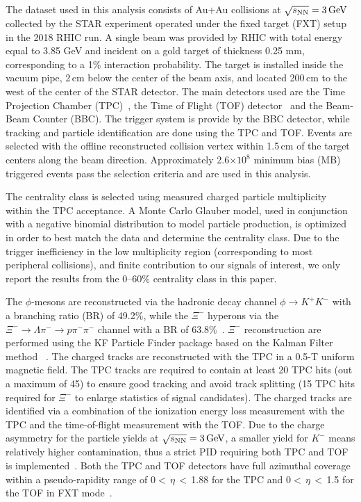 \documentclass[%
 reprint,	
showpacs,
 amsmath,amssymb,
 aps,
 prc,
]{revtex4-1}
\begin{document}
The dataset used in this analysis consists of Au+Au collisions at ${\sqrt{s_{\rm NN}} = \rm{3\,GeV}}$ collected by the STAR experiment operated under the fixed target (FXT) setup in the 2018 RHIC run. %
A single beam was provided by RHIC with total energy equal to 3.85 GeV and incident on a gold target of thickness 0.25 mm, corresponding to a 1\% interaction probability.
The target is installed inside the vacuum pipe, 2\,cm below the center of the beam axis, and located 200\,cm to the west of the center of the STAR detector. The main detectors used are the Time Projection Chamber (TPC)~\cite{TPC}, the Time of Flight (TOF) detector~\cite{TOF} and the Beam-Beam Counter (BBC). The trigger system is provide by the BBC detector, while tracking and particle identification are done using the TPC and TOF. Events are selected with the offline reconstructed collision vertex within 1.5\,cm of the target centers along the beam direction. Approximately 2.6$\times 10^{8}$ minimum bias (MB) triggered events pass the selection criteria and are used in this analysis. 

The centrality class is selected using measured charged particle multiplicity within the TPC acceptance. 
A Monte Carlo Glauber model, used in conjunction with a negative binomial distribution to model particle production, is optimized in order to best match the data and determine the centrality class. Due to the trigger inefficiency in the low multiplicity region (corresponding to most peripheral collisions), and finite contribution to our signals of interest, we only report the results from the 0--60\% centrality class in this paper.

The $\phi$-mesons are reconstructed via the hadronic decay channel $\phi\rightarrow K^+K^-$ with a branching ratio (BR) of 49.2\%, while the $\Xi^{-}$ hyperons via the $\Xi^-\rightarrow \Lambda\pi^-\rightarrow p\pi^-\pi^-$ channel with a BR of 63.8\%~\cite{pdg}. $\Xi^-$ reconstruction are performed using the KF Particle Finder package based on the Kalman Filter method
~\cite{Kisel:2018nvd}. The charged tracks are reconstructed with the TPC in a 0.5-T uniform magnetic field. The TPC tracks are required to contain at least 20 TPC hits (out a maximum of 45) to ensure good tracking and avoid track splitting (15 TPC hits required for $\Xi^{-}$ to enlarge statistics of signal candidates). The charged tracks are identified via a combination of the ionization energy loss %
measurement with the TPC and the time-of-flight %
measurement with the TOF.
Due to the charge asymmetry for the particle yields at ${\sqrt{s_{\rm NN}} = \rm{3\,GeV}}$, a smaller yield for $K^-$ means relatively higher contamination, thus a strict PID requiring both TPC and TOF is implemented~\cite{Xu:2008th,Shao:2005iu}. Both the TPC and TOF detectors have full azimuthal coverage within a pseudo-rapidity range of 0$<$\,$\eta$\,$<$\,1.88 for the TPC and 0$<$\,$\eta$\,$<$\,1.5 for the TOF in FXT mode~\cite{TPC,TOF}.
\end{document}
